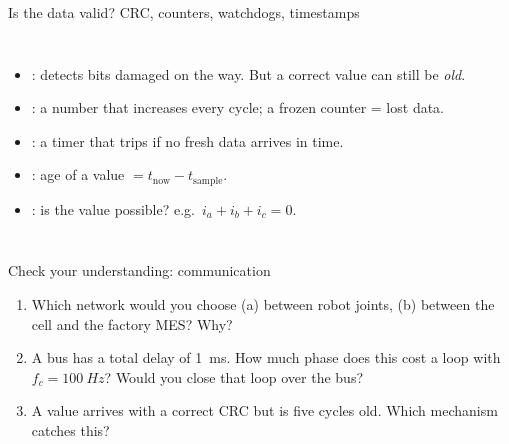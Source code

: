 \documentclass[aspectratio=169,10pt]{beamer}
\begin{document}
\begin{frame}{Is the data valid? CRC, counters, watchdogs, timestamps}
\begin{columns}[T]
\begin{itemize}\small
\item {}: detects bits damaged on the way. But a correct value can still be \emph{old}.
\item {}: a number that increases every cycle; a frozen counter = lost data.
\item {}: a timer that trips if no fresh data arrives in time.
\item {}: age of a value $=t_\text{now}-t_\text{sample}$.
\item {}: is the value possible? e.g.\ $i_a+i_b+i_c=0$.
\end{itemize}
\centering
{}
\end{columns}
\end{frame}


\begin{frame}{Check your understanding: communication}
\begin{keybox}
\large
\begin{enumerate}
\item Which network would you choose (a) between robot joints, (b) between the cell and the factory MES? Why?
\item A bus has a total delay of \SI{1}{ms}. How much phase does this cost a loop with $f_c=\SI{100}{Hz}$? Would you close that loop over the bus?
\item A value arrives with a correct CRC but is five cycles old. Which mechanism catches this?
\end{enumerate}
\end{keybox}
\end{frame}
\end{document}
